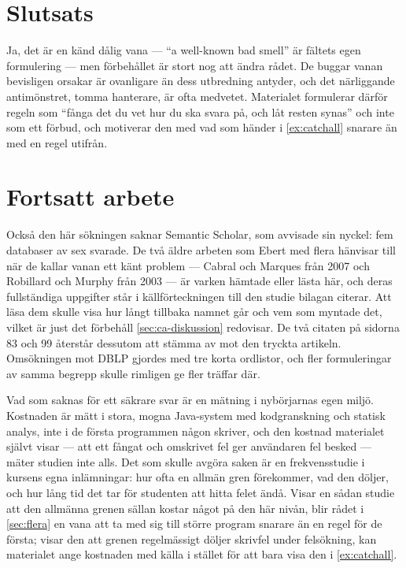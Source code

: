 \section{Slutsats}
\label{sec:ca-slutsats}

Ja, det är en känd dålig vana --- \enquote{a well-known bad smell} är
fältets egen formulering --- men förbehållet är stort nog att ändra
rådet.  De buggar vanan bevisligen orsakar är ovanligare än dess
utbredning antyder, och det närliggande antimönstret, tomma hanterare,
är ofta medvetet.  Materialet formulerar därför
regeln som \enquote{fånga det du vet hur du ska svara på, och låt resten
synas} och inte som ett förbud, och motiverar den med vad som händer i
\cref{ex:catchall} snarare än med en regel utifrån.

\section{Fortsatt arbete}
\label{sec:ca-fortsatt}

Också den här sökningen saknar Semantic Scholar, som avvisade sin
nyckel: fem databaser av sex svarade.  De två äldre arbeten som Ebert
med flera hänvisar till när de kallar vanan ett känt problem ---
Cabral och Marques från 2007 och Robillard och Murphy från 2003 --- är
varken hämtade eller lästa här, och deras fullständiga uppgifter står i
källförteckningen till den studie bilagan citerar.  Att läsa dem
skulle visa hur långt tillbaka namnet går och vem som myntade det,
vilket är just det förbehåll \cref{sec:ca-diskussion} redovisar.  De
två citaten på sidorna 83 och 99 återstår dessutom att stämma av mot
den tryckta artikeln.  Omsökningen mot DBLP gjordes med tre korta
ordlistor, och fler formuleringar av samma begrepp skulle rimligen ge
fler träffar där.

Vad som saknas för ett säkrare svar är en mätning i nybörjarnas egen
miljö.  Kostnaden är mätt i stora, mogna Java-system med kodgranskning
och statisk analys, inte i de första programmen någon skriver, och den
kostnad materialet självt visar --- att ett fångat och omskrivet fel
ger användaren fel besked --- mäter studien inte alls.  Det som skulle
avgöra saken är en frekvensstudie i kursens egna inlämningar: hur ofta
en allmän gren förekommer, vad den döljer, och hur lång tid det tar för
studenten att hitta felet ändå.  Visar en sådan studie att den allmänna
grenen sällan kostar något på den här nivån, blir rådet i
\cref{sec:flera} en vana att ta med sig till större program snarare än
en regel för de första; visar den att grenen regelmässigt döljer
skrivfel under felsökning, kan materialet ange kostnaden med källa i
stället för att bara visa den i \cref{ex:catchall}.

